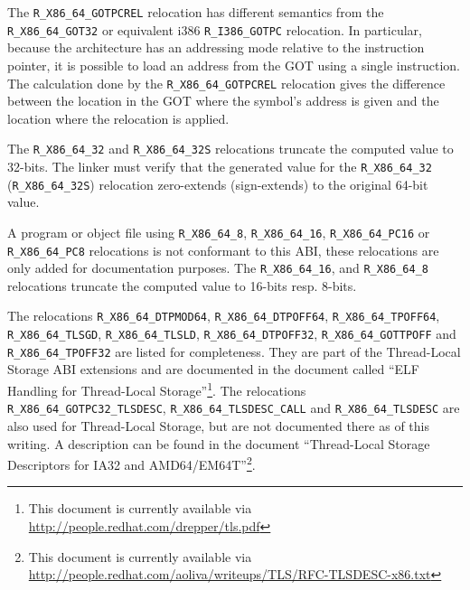 \begin{sloppypar}
The \texttt{R_X86_64_GOTPCREL} relocation has different semantics from the
\texttt{R_X86_64_GOT32} or equivalent i386 \texttt{R_I386_GOTPC} relocation.
In particular, because the \xARCH architecture has an addressing mode relative
to the instruction pointer, it is possible to load an address from the GOT
using a single instruction.  The calculation done by the
\texttt{R_X86_64_GOTPCREL} relocation gives the difference between the location
in the GOT where the symbol's address is given and the location where the
relocation is applied.
\end{sloppypar}

\begin{sloppypar}
The \texttt{R_X86_64_32} and \texttt{R_X86_64_32S} relocations truncate
the computed value to 32-bits.  The linker must verify that the
generated value for the \texttt{R_X86_64_32} (\texttt{R_X86_64_32S})
relocation zero-extends (sign-extends) to the original 64-bit value.
\end{sloppypar}

\begin{sloppypar}
A program or object file using \texttt{R_X86_64_8},
\texttt{R_X86_64_16}, \texttt{R_X86_64_PC16} or \texttt{R_X86_64_PC8}
relocations is not conformant to this ABI, these relocations are only
added for documentation purposes.  The \texttt{R_X86_64_16}, and
\texttt{R_X86_64_8} relocations truncate the computed value to 16-bits
resp. 8-bits.
\end{sloppypar}

\begin{sloppypar}
The relocations \texttt{R_X86_64_DTPMOD64},
\texttt{R_X86_64_DTPOFF64}, \texttt{R_X86_64_TPOFF64},
\texttt{R_X86_64_TLSGD}, \texttt{R_X86_64_TLSLD},
\texttt{R_X86_64_DTPOFF32}, \texttt{R_X86_64_GOTTPOFF} and
\texttt{R_X86_64_TPOFF32} are listed for completeness.  They are part
of the Thread-Local Storage ABI extensions and are documented in the
document called ``ELF Handling for Thread-Local
Storage''\footnote{This document is currently available via
  \url{http://people.redhat.com/drepper/tls.pdf}}.  The relocations \texttt{R_X86_64_GOTPC32_TLSDESC},
\texttt{R_X86_64_TLSDESC_CALL} and \texttt{R_X86_64_TLSDESC} are also
used for Thread-Local Storage, but are not documented there as of this
writing.  A description can be found in the document ``Thread-Local
Storage Descriptors for IA32 and AMD64/EM64T''\footnote{This document
  is currently available via
  \url{http://people.redhat.com/aoliva/writeups/TLS/RFC-TLSDESC-x86.txt}}.
\end{sloppypar}

